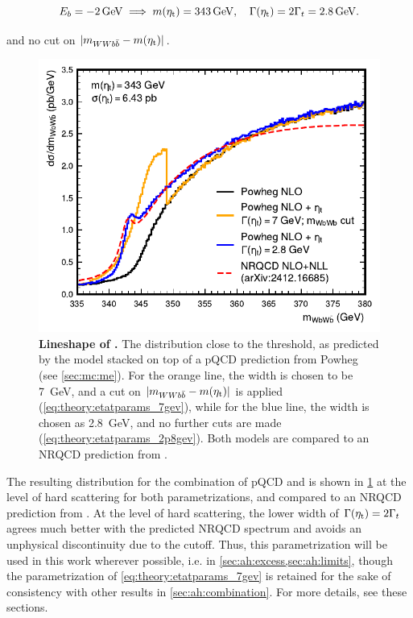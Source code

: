 \begin{equation}
  \label{eq:theory:etatparams_2p8gev}
  E_b = \SI{-2}{\GeV} \implies \metat = \SI{343}{\GeV}, \quad \Gammaetat = 2 \Gamma_{t} = \SI{2.8}{\GeV}.
\end{equation}

\noindent and no cut on $|m_{WWb\bar{b}} - m(\mathrm{\eta_t})|$.

\begin{figure}[t]
    \centering
    \includegraphics[width=0.65\linewidth]{figures/ah/powheg_etat_nlo.pdf}
    \caption{\textbf{Lineshape of \etat.} The \mWWbb distribution close to the \ttbar threshold, as predicted by the \etat model stacked on top of a pQCD \ttbar prediction from Powheg \hvq (see \cref{sec:mc:me}). For the orange line, the \etat width is chosen to be \SI{7}{\GeV}, and a cut on $|m_{WWb\bar{b}} - m(\mathrm{\eta_t})|$ is applied (\cref{eq:theory:etatparams_7gev}), while for the blue line, the width is chosen as \SI{2.8}{\GeV}, and no further cuts are made (\cref{eq:theory:etatparams_2p8gev}). Both models are compared to an NRQCD prediction from .}
    \label{fig:theory:etat}
\end{figure}

The resulting \mWWbb distribution for the combination of pQCD \ttbar and \etat is shown in \cref{fig:theory:etat} at the level of hard scattering for both parametrizations, and compared to an NRQCD prediction from .
At the level of hard scattering, the lower width of $\Gamma(\mathrm{\eta_t}) = 2 \Gamma_t$ agrees much better with the predicted NRQCD spectrum and avoids an unphysical discontinuity due to the \mWWbb cutoff. Thus, this parametrization will be used in this work wherever possible, i.e. in \cref{sec:ah:excess,sec:ah:limits}, though the parametrization of \cref{eq:theory:etatparams_7gev} is retained for the sake of consistency with other results in \cref{sec:ah:combination}. For more details, see these sections.

